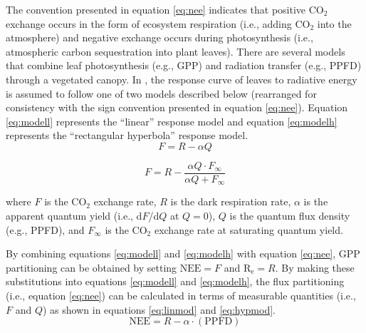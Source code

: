 \noindent The convention presented in equation \ref{eq:nee} indicates that positive CO$_{2}$ exchange occurs in the form of ecosystem respiration (i.e., adding CO$_{2}$ into the atmosphere) and negative exchange occurs during photosynthesis (i.e., atmospheric carbon sequestration into plant leaves). 
There are several models that combine leaf photosynthesis (e.g., GPP) and radiation transfer (e.g., PPFD) through a vegetated canopy.  
In \parencite{ruimy95}, the response curve of leaves to radiative energy is assumed to follow one of two models described below (rearranged for consistency with the sign convention presented in equation \ref{eq:nee}).  
Equation \ref{eq:modell} represents the ``linear'' response model and equation \ref{eq:modelh} represents the ``rectangular hyperbola'' response model.
%
%
%
%
\begin{equation}
\label{eq:modell}
    F = R - \alpha Q
\end{equation}

\begin{equation}
\label{eq:modelh}
    F = R - \frac{\alpha Q \cdot F_{\infty}}
          {\alpha Q + F_{\infty}}
\end{equation}

\noindent where $F$ is the CO$_2$ exchange rate, $R$ is the dark respiration rate, $\alpha$ is the apparent quantum yield (i.e., d$F$/d$Q$ at $Q=0$), $Q$ is the quantum flux density (e.g., PPFD), and $F_{\infty}$ is the CO$_{2}$ exchange rate at saturating quantum yield. 

By combining equations \ref{eq:modell} and \ref{eq:modelh} with equation \ref{eq:nee}, GPP partitioning can be obtained by setting $\text{NEE} = F$ and $\text{R}_{\text{e}} = R$. 
By making these substitutions into equations \ref{eq:modell} and \ref{eq:modelh}, the flux partitioning (i.e., equation \ref{eq:nee}) can be calculated in terms of measurable quantities (i.e., $F$ and $Q$) as shown in equations \ref{eq:linmod} and \ref{eq:hypmod}.
\begin{equation}
\label{eq:linmod}
    \text{NEE} = R - \alpha \cdot (\text{PPFD})
\end{equation}

